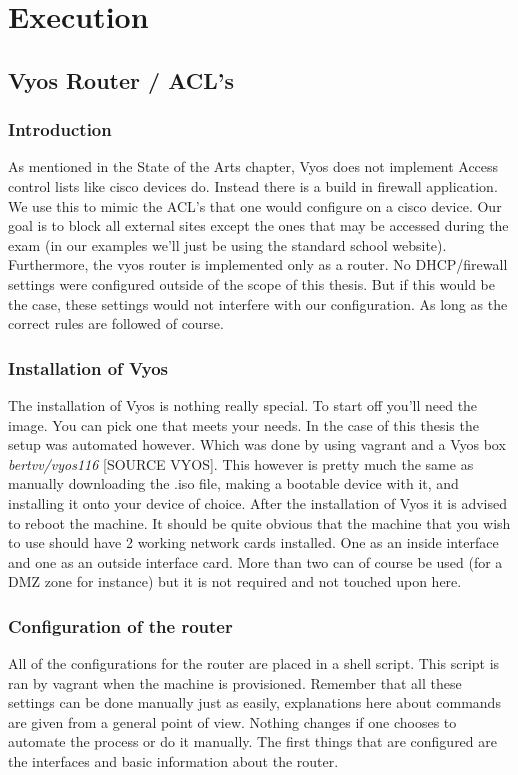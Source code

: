
\chapter{Execution}
\label{ch:execution}

\section{Vyos Router / ACL's}
\subsection{Introduction}
As mentioned in the State of the Arts chapter, Vyos does not implement Access control lists like cisco devices do. Instead there is a build in firewall application. We use this to mimic the ACL's that one would configure on a cisco device. Our goal is to block all external sites except the ones that may be accessed during the exam (in our examples we'll just be using the standard school website). Furthermore, the vyos router is implemented only as a router. No DHCP/firewall settings were configured outside of the scope of this thesis. But if this would be the case, these settings would not interfere with our configuration. As long as the correct rules are followed of course. 
\subsection{Installation of Vyos}
The installation of Vyos is nothing really special. To start off you'll need the image. You can pick one that meets your needs. In the case of this thesis the setup was automated however. Which was done by using vagrant and a Vyos box \textit{bertvv/vyos116} [SOURCE VYOS]. This however is pretty much the same as manually downloading the .iso file, making a bootable device with it, and installing it onto your device of choice. After the installation of Vyos it is advised  to reboot the machine. It should be quite obvious that the machine that you wish to use should have 2 working network cards installed. One as an inside interface and one as an outside interface card. More than two can of course be used (for a DMZ zone for instance) but it is not required and not touched upon here.
\subsection{Configuration of the router}
All of the configurations for the router are placed in a shell script. This script is ran by vagrant when the machine is provisioned. Remember that all these settings can be done manually just as easily, explanations here about commands are given from a general point of view. Nothing changes if one chooses to automate the process or do it manually. The first things that are configured are the interfaces and basic information about the router.\\

